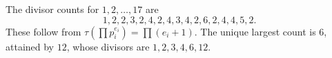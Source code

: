 The divisor counts for $1,2,\ldots,17$ are
\[
1,2,2,3,2,4,2,4,3,4,2,6,2,4,4,5,2.
\]
These follow from $\tau(\prod p_i^{e_i})=\prod(e_i+1)$. The unique largest count is $6$, attained by $\boxed{12}$, whose divisors are $1,2,3,4,6,12$.
